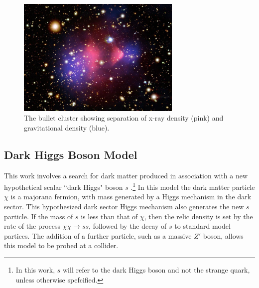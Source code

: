 \begin{figure}[H]
    \centering
    \includegraphics[width=0.7\textwidth]{Figures/1/bullet.png}
    \caption{The bullet cluster showing separation of x-ray density (pink) and gravitational density (blue).}
    \label{fig:bullet}
\end{figure}

\subsection{Dark Higgs Boson Model}
\label{subsection:dh_model}
This work involves a search for dark matter produced in association with a new hypothetical scalar ``dark Higgs" boson $s$ \cite{Hunting}.\footnote{In this work, $s$ will refer  to the dark Higgs boson and not the strange quark, unless otherwise spefcified.} In this model the dark matter particle $\chi$ is a majorana fermion, with mass generated by a Higgs mechanism in the dark sector. This hypothesized dark sector Higgs mechanism also generates the new $s$ particle. If the mass of $s$ is less than that of $\chi$, then the relic density is set by the rate of the process $\chi\chi \rightarrow ss$, followed by the decay of $s$ to standard model partices. The addition of a further particle, such as a massive $Z'$ boson, allows this model to be probed at a collider.

